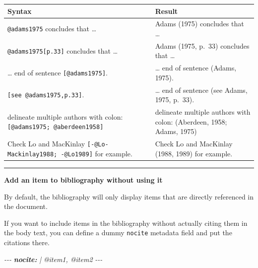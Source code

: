 \documentclass[
]{book}
\newenvironment{Shaded}{\begin{snugshade}}{\end{snugshade}}
\newcommand{\AnnotationTok}[1]{\textcolor[rgb]{0.56,0.35,0.01}{\textbf{\textit{#1}}}}
\newcommand{\CommentTok}[1]{\textcolor[rgb]{0.56,0.35,0.01}{\textit{#1}}}
\theoremstyle{definition}
\theoremstyle{definition}
\theoremstyle{definition}
\theoremstyle{definition}
\theoremstyle{remark}
\begin{document}
\begin{longtable}[]{@{}
  >{\raggedright\arraybackslash}p{}
  >{\raggedright\arraybackslash}p{}@{}}
\toprule\noalign{}
\begin{minipage}[b]{\linewidth}\raggedright
Syntax
\end{minipage} & \begin{minipage}[b]{\linewidth}\raggedright
Result
\end{minipage} \\
\midrule\noalign{}
\endhead
\bottomrule\noalign{}
\endlastfoot
\texttt{@adams1975} concludes that \ldots{} & Adams (1975) concludes that \ldots{} \\
\texttt{@adams1975{[}p.33{]}} concludes that \ldots{} & Adams (1975, p.~33) concludes that \ldots{} \\
\ldots{} end of sentence \texttt{{[}@adams1975{]}}. & \ldots{} end of sentence (Adams, 1975). \\
\texttt{{[}see\ @adams1975,p.33{]}}. & \ldots{} end of sentence (see Adams, 1975, p.~33). \\
delineate multiple authors with colon: \texttt{{[}@adams1975;\ @aberdeen1958{]}} & delineate multiple authors with colon: (Aberdeen, 1958; Adams, 1975) \\
Check Lo and MacKinlay \texttt{{[}-@Lo-Mackinlay1988;\ -@Lo1989{]}} for example. & Check Lo and MacKinlay (1988, 1989) for example. \\
\end{longtable}

\begin{center}\rule{0.5\linewidth}{0.5pt}\end{center}

\textbf{Add an item to bibliography without using it}

By default, the bibliography will only display items that are directly referenced in the document.

If you want to include items in the bibliography without actually citing them in the body text, you can define a dummy \texttt{nocite} metadata field and put the citations there.

\begin{Shaded}
\begin{Highlighting}[]
\CommentTok{{-}{-}{-}}
\AnnotationTok{nocite:}\CommentTok{ |}
\CommentTok{  @item1, @item2}
\CommentTok{{-}{-}{-}}
\end{Highlighting}
\end{Shaded}
\end{document}

